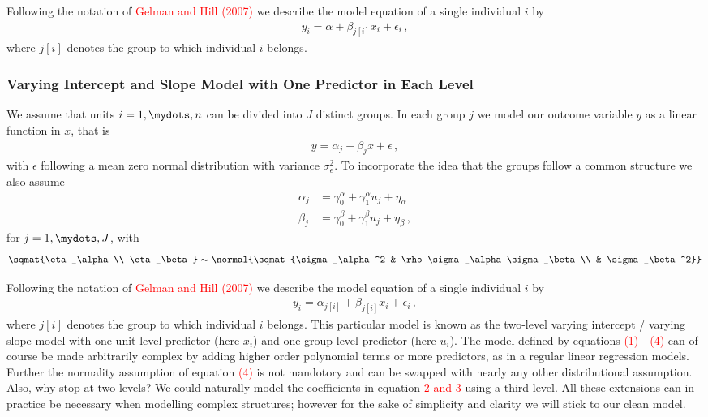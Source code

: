 Following the notation of \textcolor{red}{Gelman and Hill (2007)} we describe the model equation of a single individual $i$ by
\begin{align}
  y_i = \alpha + \beta_{j[i]} x_i + \epsilon_i \,,
\end{align}
where $j[i]$ denotes the group to which individual $i$ belongs.

\subsubsection{Varying Intercept and Slope Model with One Predictor in Each Level}
We assume that units $i = 1,\mydots,n$ can be divided into $J$ distinct groups.
In each group $j$ we model our outcome variable $y$ as a linear function in $x$,
that is
\begin{align}
  y = \alpha_j + \beta_j x + \epsilon \,,
\end{align}
with $\epsilon$ following a mean zero normal distribution with variance
$\sigma_{\epsilon}^2$.
To incorporate the idea that the groups follow a common structure we also
assume
\begin{align}
  \alpha_j &= \gamma_0^{\alpha} + \gamma_1^{\alpha} u_j + \eta_\alpha \\
  \beta_j &= \gamma_0^{\beta} + \gamma_1^{\beta} u_j + \eta_\beta \,,
\end{align}
for $j = 1,\mydots,J$, with
\begin{align}
  \sqmat{\eta_\alpha \\ \eta_\beta} \sim \normal{\sqmat{\sigma_\alpha^2 & \rho \sigma_\alpha \sigma_\beta \\ & \sigma_\beta^2}}
\end{align}

Following the notation of \textcolor{red}{Gelman and Hill (2007)} we describe the model equation of a single individual $i$ by
\begin{align}
  y_i = \alpha_{j[i]} + \beta_{j[i]} x_i + \epsilon_i \,,
\end{align}
where $j[i]$ denotes the group to which individual $i$ belongs.
This particular model is known as the two-level varying intercept / varying slope model with one unit-level predictor (here $x_i$) and one group-level predictor
(here $u_i$). The model defined by equations \textcolor{red}{(1) - (4)} can of
course be made arbitrarily complex by adding higher order polynomial terms or
more predictors, as in a regular linear regression models. Further the normality
assumption of equation \textcolor{red}{(4)} is not mandotory and can be swapped
with nearly any other distributional assumption. Also, why stop at two levels?
We could naturally model the coefficients in equation \textcolor{red}{2 and 3}
using a third level. All these extensions can in practice be necessary when
modelling complex structures; however for the sake of simplicity and clarity
we will stick to our clean model.
